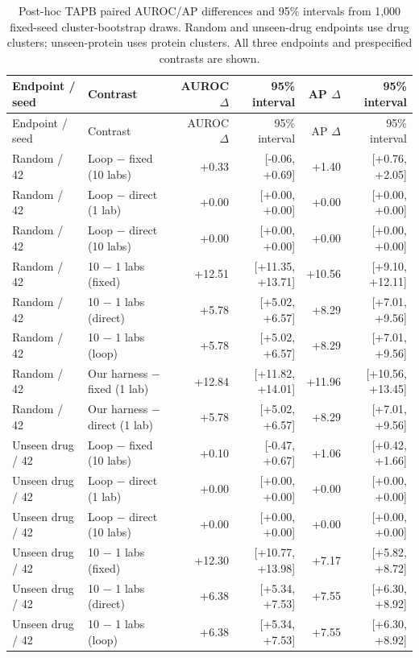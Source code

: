 \begingroup\scriptsize\setlength{\tabcolsep}{3pt}
\begin{longtable}{llrrrr}
\caption{Post-hoc TAPB paired AUROC/AP differences and 95\% intervals from 1,000 fixed-seed cluster-bootstrap draws. Random and unseen-drug endpoints use drug clusters; unseen-protein uses protein clusters. All three endpoints and prespecified contrasts are shown.}\label{tab:strong-dti-uncertainty}\\
\toprule Endpoint / seed & Contrast & AUROC $\Delta$ & 95\% interval & AP $\Delta$ & 95\% interval \\ \midrule\endfirsthead
\toprule Endpoint / seed & Contrast & AUROC $\Delta$ & 95\% interval & AP $\Delta$ & 95\% interval \\ \midrule\endhead
Random / 42 & Loop $-$ fixed (10 labs) & +0.33 & [-0.06, +0.69] & +1.40 & [+0.76, +2.05] \\
Random / 42 & Loop $-$ direct (1 lab) & +0.00 & [+0.00, +0.00] & +0.00 & [+0.00, +0.00] \\
Random / 42 & Loop $-$ direct (10 labs) & +0.00 & [+0.00, +0.00] & +0.00 & [+0.00, +0.00] \\
Random / 42 & 10 $-$ 1 labs (fixed) & +12.51 & [+11.35, +13.71] & +10.56 & [+9.10, +12.11] \\
Random / 42 & 10 $-$ 1 labs (direct) & +5.78 & [+5.02, +6.57] & +8.29 & [+7.01, +9.56] \\
Random / 42 & 10 $-$ 1 labs (loop) & +5.78 & [+5.02, +6.57] & +8.29 & [+7.01, +9.56] \\
Random / 42 & Our harness $-$ fixed (1 lab) & +12.84 & [+11.82, +14.01] & +11.96 & [+10.56, +13.45] \\
Random / 42 & Our harness $-$ direct (1 lab) & +5.78 & [+5.02, +6.57] & +8.29 & [+7.01, +9.56] \\
\midrule
Unseen drug / 42 & Loop $-$ fixed (10 labs) & +0.10 & [-0.47, +0.67] & +1.06 & [+0.42, +1.66] \\
Unseen drug / 42 & Loop $-$ direct (1 lab) & +0.00 & [+0.00, +0.00] & +0.00 & [+0.00, +0.00] \\
Unseen drug / 42 & Loop $-$ direct (10 labs) & +0.00 & [+0.00, +0.00] & +0.00 & [+0.00, +0.00] \\
Unseen drug / 42 & 10 $-$ 1 labs (fixed) & +12.30 & [+10.77, +13.98] & +7.17 & [+5.82, +8.72] \\
Unseen drug / 42 & 10 $-$ 1 labs (direct) & +6.38 & [+5.34, +7.53] & +7.55 & [+6.30, +8.92] \\
Unseen drug / 42 & 10 $-$ 1 labs (loop) & +6.38 & [+5.34, +7.53] & +7.55 & [+6.30, +8.92] \\

\end{longtable}
